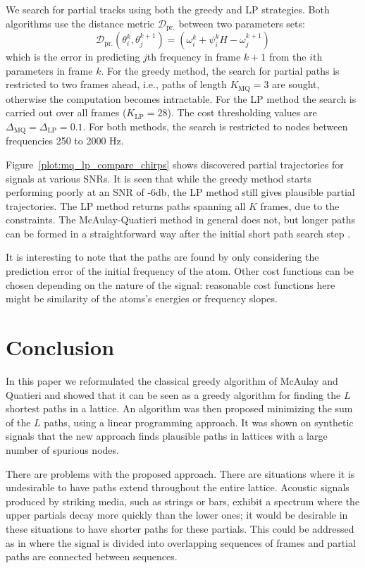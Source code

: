 \documentclass{article}
\begin{document}
\begin{sloppy}
We search for partial tracks using both the greedy and LP strategies. Both
algorithms use the distance metric $\mathcal{D}_{\text{pr.}}$ between two parameters sets:
\[
    \mathcal{D}_{\text{pr.}} \left( \theta_{i}^{k},
    \theta_{j}^{k+1} \right) = \left( \omega_{i}^{k} +
    \psi_{i}^{k} H - \omega_{j}^{k+1} \right)
\]
which is the error in predicting $j$th frequency in frame $k+1$ from the $i$th
parameters in frame $k$. For the greedy method, the search for partial paths is
restricted to two frames ahead, i.e., paths of length $K_{\text{MQ}}=3$ are sought, otherwise the
computation becomes intractable. For the LP
method the search is carried out over all frames ($K_{\text{LP}}=28$). %
The cost thresholding values are ${\Delta_{\text{MQ}} = \Delta_{\text{LP}} =
0.1}$. For both methods, the search is restricted
to nodes between frequencies 250 to 2000 Hz.

Figure~\ref{plot:mq_lp_compare_chirps}
shows discovered partial trajectories for signals at various SNRs. It is seen
that while the greedy method starts performing poorly at an SNR of -6db, the LP method
still gives plausible partial trajectories. The LP method returns paths spanning
all $K$ frames, due to the constraints. The McAulay-Quatieri method in general does not,
but longer paths can be formed in a straightforward way after the initial short path
search step \cite{mcaulay1986speech}.

It is interesting to note that the paths are found by only considering the
prediction error of the initial frequency of the atom. Other cost functions can
be chosen depending on the nature of the signal: reasonable cost functions here
might be similarity of the atoms's energies or frequency slopes.

\section{Conclusion}

In this paper we reformulated the classical greedy algorithm of McAulay and
Quatieri and showed that it can be seen as a greedy algorithm for finding the $L$
shortest paths in a lattice. An algorithm was then proposed minimizing the sum
of the $L$ paths, using a linear programming approach. It was shown on synthetic
signals that the new approach finds plausible paths in lattices with a
large number of spurious nodes.

There are problems with the proposed approach. 
There are situations where it is undesirable to have paths extend
throughout the entire lattice. Acoustic signals produced by striking media, such
as strings or bars, exhibit a spectrum where the upper partials decay more
quickly than the lower ones; it
would be desirable in these situations to have shorter paths for these
partials. This could be addressed as in
\cite{depalle1993tracking} where the signal is divided into overlapping sequences of
frames and partial paths are connected between sequences.


\end{sloppy}
\end{document}
